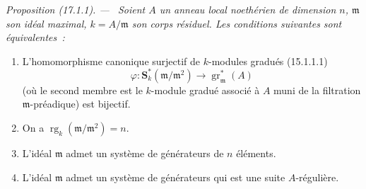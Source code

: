 \documentclass[10pt,oneside]{book}
\makeatletter
\newcommand{\setmanualcurrentlabel}[1]{\def\@currentlabel{#1}}
\newenvironment{proposition}[1][]{%
  \setmanualcurrentlabel{#1}\par\medskip\noindent\itshape Proposition (#1). ---\ }{\par}
\makeatother
\begin{document}
\begin{proposition}[17.1.1]
\label{0.17.1.1-fr}
Soient $A$ un anneau local noethérien de dimension $n$, $\mathfrak{m}$ son
idéal maximal, $k=A/\mathfrak{m}$ son corps résiduel. Les conditions suivantes
sont équivalentes~:
\begin{enumerate}
  \item[\rm a)] L'homomorphisme canonique surjectif de $k$-modules gradués
  (15.1.1.1)
  \[
    \varphi:\mathbf{S}^*_k(\mathfrak{m}/\mathfrak{m}^2)
    \longrightarrow\operatorname{gr}^*_{\mathfrak{m}}(A)
  \]
  (où le second membre est le $k$-module gradué associé à $A$ muni de la
  filtration $\mathfrak{m}$-préadique) est bijectif.
  \item[\rm b)] On a
  $\operatorname{rg}_k(\mathfrak{m}/\mathfrak{m}^2)=n$.
  \item[\rm c)] L'idéal $\mathfrak{m}$ admet un système de générateurs de $n$
  éléments.
  \item[\rm d)] L'idéal $\mathfrak{m}$ admet un système de générateurs qui est
  une suite $A$-régulière.
\end{enumerate}
\end{proposition}
\end{document}
